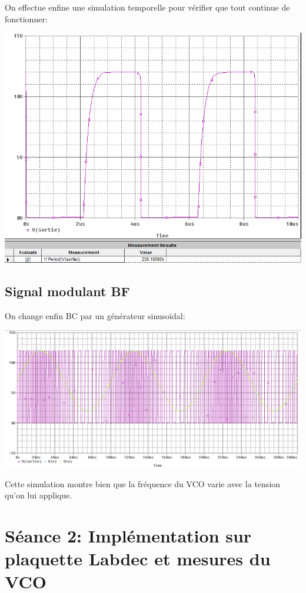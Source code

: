 On effectue enfine une simulation temporelle pour vérifier que tout continue de fonctionner:

\includegraphics[width=\linewidth]{../img/simu_temporelle_bloc_hierarchique.png}

\subsection{Signal modulant BF}

On change enfin BC par un générateur sinusoïdal:

\includegraphics[width=\linewidth]{../img/variation_freq_sinus_en_entree.png}

Cette simulation montre bien que la fréquence du VCO varie avec la tension qu’on lui applique.

\section{Séance 2: Implémentation sur plaquette Labdec et mesures du VCO}
